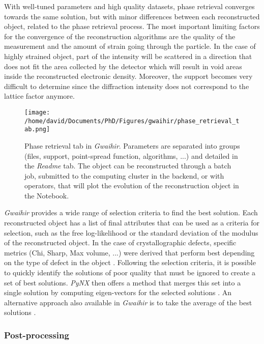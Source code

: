 With well-tuned parameters and high quality datasets, phase retrieval converges towards the same solution, but with minor differences between each reconstructed object, related to the phase retrieval process.
The most important limiting factors for the convergence of the reconstruction algorithms are the quality of the measurement and the amount of strain going through the particle.
In the case of highly strained object, part of the intensity will be scattered in a direction that does not fit the area collected by the detector which will result in void areas inside the reconstructed electronic density.
Moreover, the support becomes very difficult to determine since the diffraction intensity does not correspond to the lattice factor anymore.

\begin{figure}[!htb]
    \centering
    \texttt{[image: /home/david/Documents/PhD/Figures/gwaihir/phase\_retrieval\_tab.png]}
    \caption{
    Phase retrieval tab in \textit{Gwaihir}.
    Parameters are separated into groups (files, support, point-spread function, algorithms, ...) and detailed in the \textit{Readme} tab.
    The object can be reconstructed through a batch job, submitted to the computing cluster in the backend, or with operators, that will plot the evolution of the reconstruction object in the Notebook.
    }
    \label{fig:PRT}
\end{figure}

\textit{Gwaihir} provides a wide range of selection criteria to find the best solution.
Each reconstructed object has a list of final attributes that can be used as a criteria for selection, such as the free log-likelihood \parencite{FavreNicolin2020a} or the standard deviation of the modulus of the reconstructed object.
In the case of crystallographic defects, specific metrics (Chi, Sharp, Max volume, ...) were derived that perform best depending on the type of defect in the object \parencite{Ulvestad2017}.
Following the selection criteria, it is possible to quickly identify the solutions of poor quality that must be ignored to create a set of best solutions.
\textit{PyNX} then offers a method that merges this set into a single solution by computing eigen-vectors for the selected solutions \parencite{FavreNicolin2020}.
An alternative approach also available in \textit{Gwaihir} is to take the average of the best solutions \parencite{Ulvestad2014}.

\subsubsection{Post-processing} \label{sec:postprocess}

